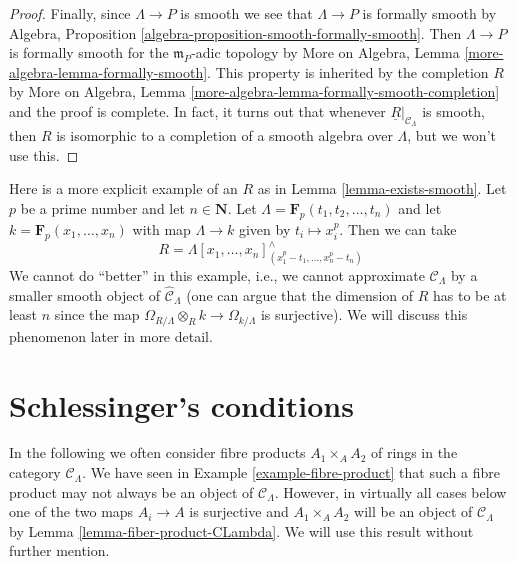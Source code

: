 \begin{proof}
\medskip\noindent
Finally, since $\Lambda \to P$ is smooth we see that
$\Lambda \to P$ is formally smooth by
Algebra, Proposition \ref{algebra-proposition-smooth-formally-smooth}.
Then $\Lambda \to P$ is formally smooth for the $\mathfrak m_P$-adic
topology by More on Algebra, Lemma \ref{more-algebra-lemma-formally-smooth}.
This property is inherited by the completion $R$ by
More on Algebra, Lemma \ref{more-algebra-lemma-formally-smooth-completion}
and the proof is complete.
In fact, it turns out that whenever $\underline{R}|_{\mathcal{C}_\Lambda}$
is smooth, then $R$ is isomorphic to a completion of a smooth
algebra over $\Lambda$, but we won't use this.
\end{proof}

\begin{example}
\label{example-smooth-explicit}
Here is a more explicit example of an $R$ as in
Lemma \ref{lemma-exists-smooth}.
Let $p$ be a prime number and let $n \in \mathbf{N}$.
Let $\Lambda = \mathbf{F}_p(t_1, t_2, \ldots, t_n)$ and let
$k = \mathbf{F}_p(x_1, \ldots, x_n)$ with map $\Lambda \to k$ given
by $t_i \mapsto x_i^p$. Then we can take
$$
R = \Lambda[x_1, \ldots, x_n]^\wedge_{(x_1^p - t_1, \ldots, x_n^p - t_n)}
$$
We cannot do ``better'' in this example, i.e., we cannot approximate
$\mathcal{C}_\Lambda$ by a smaller smooth object of
$\widehat{\mathcal{C}}_\Lambda$ (one can argue that the dimension of $R$
has to be at least $n$ since the map
$\Omega_{R/\Lambda} \otimes_R k \to \Omega_{k/\Lambda}$ is
surjective). We will discuss this phenomenon later in more detail.
\end{example}







\section{Schlessinger's conditions}
\label{section-schlessinger-conditions}

\noindent
In the following we often consider fibre products $A_1 \times_A A_2$
of rings in the category $\mathcal{C}_\Lambda$. We have seen in
Example \ref{example-fibre-product}
that such a fibre product may not always be an object of
$\mathcal{C}_\Lambda$. However, in virtually all cases below one of the
two maps $A_i \to A$ is surjective and $A_1 \times_A A_2$ will be
an object of $\mathcal{C}_\Lambda$ by
Lemma \ref{lemma-fiber-product-CLambda}.
We will use this result without further mention.

